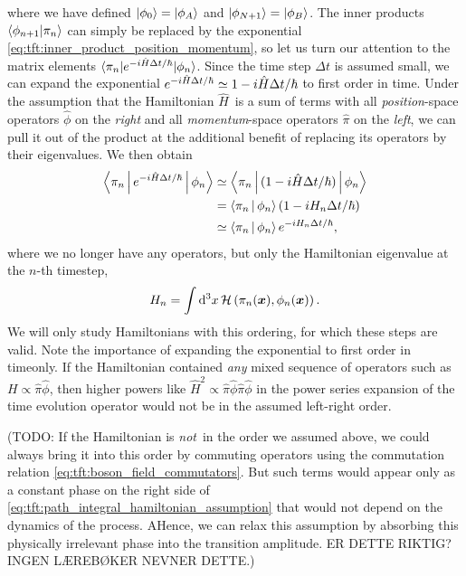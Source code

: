 where we have defined $\ket{\phi_0} = \ket{\phi_A}$ and $\ket{\phi_{N+1}} = \ket{\phi_B}$.
The inner products $\braket{\phi_{n+1} | \pi_n}$ can simply be replaced by the exponential \eqref{eq:tft:inner_product_position_momentum}, so let us turn our attention to the matrix elements $\braket{\pi_n | e^{- i \hat{H} \Delta t / \hbar} | \phi_n}$.
Since the time step $\Delta t$ is assumed small, we can expand the exponential $e^{- i \hat{H} \Delta t / \hbar} \simeq 1 - i \hat{H} \Delta t / \hbar$ to first order in time.
Under the assumption that the Hamiltonian $\hat{H}$ is a sum of terms with all \emph{position}-space operators $\hat{\phi}$ on the \emph{right} and all \emph{momentum}-space operators $\hat{\pi}$ on the \emph{left}, we can pull it out of the product at the additional benefit of replacing its operators by their eigenvalues.
We then obtain
\begin{equation}
\begin{split}
	\Braket{\pi_n | e^{- i \hat{H} \Delta t / \hbar} | \phi_n} &\simeq \Braket{\pi_n | (1 - i \hat{H} \Delta t / \hbar) | \phi_n} \\
	                                                   &=       \Braket{\pi_n | \phi_n} (1 - i H_n \Delta t / \hbar) \\
	                                                   &\simeq \Braket{\pi_n | \phi_n} e^{- i H_n \Delta t / \hbar}, \\
\end{split}
\label{eq:tft:path_integral_hamiltonian_assumption}
\end{equation}
where we no longer have any operators, but only the Hamiltonian eigenvalue at the $n$-th timestep,
\begin{equation}
	H_n = \int \mathop{}\!\mathrm{d}^3 x \, \mathcal{H} \left( \pi_n({\bm{x}}), \phi_n({\bm{x}}) \right) .
\label{eq:tft:hamiltonian_eigenvalues}
\end{equation}
We will only study Hamiltonians with this ordering, for which these steps are valid.
Note the importance of expanding the exponential to first order in timeonly.
If the Hamiltonian contained \emph{any} mixed sequence of operators such as $H \propto \hat{\pi} \hat{\phi}$, then higher powers like $\hat{H}^2 \propto \hat{\pi} \hat{\phi} \hat{\pi} \hat{\phi}$ in the power series expansion of the time evolution operator would not be in the assumed left-right order.

\iffalse
(TODO: If the Hamiltonian is \emph{not} in the order we assumed above, we could always bring it into this order by commuting operators using the commutation relation \eqref{eq:tft:boson_field_commutators}.
But such terms would appear only as a constant phase on the right side of \eqref{eq:tft:path_integral_hamiltonian_assumption} that would not depend on the dynamics of the process.
AHence, we can relax this assumption by absorbing this physically irrelevant phase into the transition amplitude. ER DETTE RIKTIG? INGEN LÆREBØKER NEVNER DETTE.)

